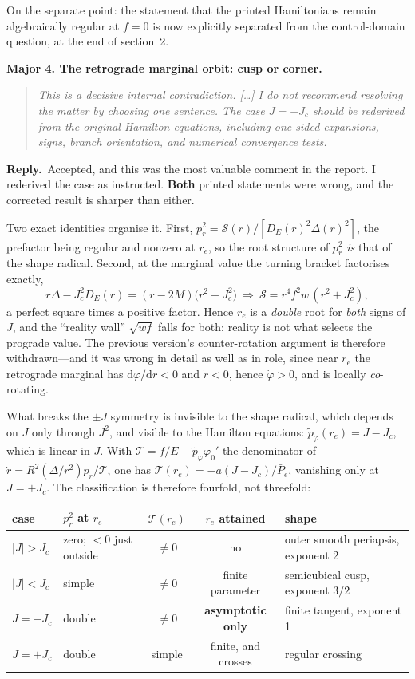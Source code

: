 \documentclass[11pt]{article}
\newenvironment{referee}
  {\begin{quote}\itshape\small}
  {\end{quote}}
\newcommand{\reply}{\par\noindent\textbf{Reply.}\ }
\newcommand{\dd}{\mathrm{d}}
\newcommand{\R}[1]{\par\medskip\noindent\textbf{#1}\par\nopagebreak}
\begin{document}
On the separate point: the statement that the printed Hamiltonians remain
algebraically regular at $f=0$ is now explicitly separated from the
control-domain question, at the end of section~2.

\R{Major 4. The retrograde marginal orbit: cusp or corner.}

\begin{referee}
This is a decisive internal contradiction. [\dots] I do not recommend resolving
the matter by choosing one sentence. The case $J=-J_c$ should be rederived from
the original Hamilton equations, including one-sided expansions, signs, branch
orientation, and numerical convergence tests.
\end{referee}

\reply Accepted, and this was the most valuable comment in the report. I
rederived the case as instructed. \textbf{Both} printed statements were wrong,
and the corrected result is sharper than either.

Two exact identities organise it. First,
$p_r^2=\mathcal S(r)/[D_E(r)^2\Delta(r)^2]$, the prefactor being regular and
nonzero at $r_e$, so the root structure of $p_r^2$ \emph{is} that of the shape
radical. Second, at the marginal value the turning bracket factorises exactly,
\[
  r\Delta-J_c^2D_E(r)=(r-2M)\big(r^2+J_c^2\big)
  \ \Longrightarrow\
  \mathcal S=r^4f^2w\,(r^2+J_c^2),
\]
a perfect square times a positive factor. Hence $r_e$ is a \emph{double} root for
\emph{both} signs of $J$, and the ``reality wall'' $\sqrt{wf}$ falls for both:
reality is not what selects the prograde value. The previous version's
counter-rotation argument is therefore withdrawn---and it was wrong in detail as
well as in role, since near $r_e$ the retrograde marginal has
$\dd\varphi/\dd r<0$ and $\dot r<0$, hence $\dot\varphi>0$, and is locally
\emph{co}-rotating.

What breaks the $\pm J$ symmetry is invisible to the shape radical, which
depends on $J$ only through $J^2$, and visible to the Hamilton equations:
$\tilde p_\varphi(r_e)=J-J_c$, which is linear in $J$. With
$\mathcal T=f/E-\tilde p_\varphi\varphi_0'$ the denominator of
$\dot r=R^2(\Delta/r^2)p_r/\mathcal T$, one has
$\mathcal T(r_e)=-a(J-J_c)/\bar P_e$, vanishing only at $J=+J_c$. The
classification is therefore fourfold, not threefold:

\begin{center}\small
\begin{tabular}{@{}llccl@{}}
\hline
case & $p_r^2$ at $r_e$ & $\mathcal T(r_e)$ & $r_e$ attained & shape\\
\hline
$|J|>J_c$ & zero; $<0$ just outside & $\neq0$ & no & outer smooth periapsis, exponent 2\\
$|J|<J_c$ & simple & $\neq0$ & finite parameter & semicubical cusp, exponent $3/2$\\
$J=-J_c$ & double & $\neq0$ & \textbf{asymptotic only} & finite tangent, exponent 1\\
$J=+J_c$ & double & simple & finite, and crosses & regular crossing\\
\hline
\end{tabular}
\end{center}
\end{document}
